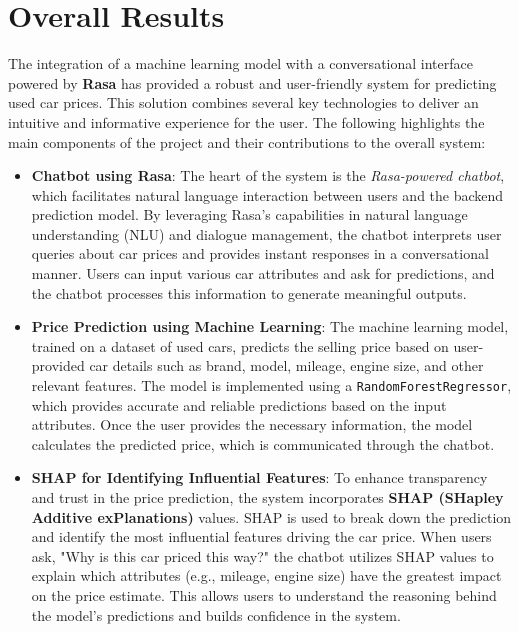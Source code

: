 \documentclass[a4paper,12pt]{article}
\begin{document}
\section{Overall Results}
\begin{justify}
	The integration of a machine learning model with a conversational interface powered by \textbf{Rasa} has provided a robust and user-friendly system for predicting used car prices. This solution combines several key technologies to deliver an intuitive and informative experience for the user. The following highlights the main components of the project and their contributions to the overall system:
	
	\begin{itemize}
		\item \textbf{Chatbot using Rasa}: The heart of the system is the \textit{Rasa-powered chatbot}, which facilitates natural language interaction between users and the backend prediction model. By leveraging Rasa’s capabilities in natural language understanding (NLU) and dialogue management, the chatbot interprets user queries about car prices and provides instant responses in a conversational manner. Users can input various car attributes and ask for predictions, and the chatbot processes this information to generate meaningful outputs.
		
		\item \textbf{Price Prediction using Machine Learning}: The machine learning model, trained on a dataset of used cars, predicts the selling price based on user-provided car details such as brand, model, mileage, engine size, and other relevant features. The model is implemented using a \texttt{RandomForestRegressor}, which provides accurate and reliable predictions based on the input attributes. Once the user provides the necessary information, the model calculates the predicted price, which is communicated through the chatbot.
		
		\item \textbf{SHAP for Identifying Influential Features}: To enhance transparency and trust in the price prediction, the system incorporates \textbf{SHAP (SHapley Additive exPlanations)} values. SHAP is used to break down the prediction and identify the most influential features driving the car price. When users ask, "Why is this car priced this way?" the chatbot utilizes SHAP values to explain which attributes (e.g., mileage, engine size) have the greatest impact on the price estimate. This allows users to understand the reasoning behind the model’s predictions and builds confidence in the system.
		

\end{itemize}
\end{justify}
\end{document}
